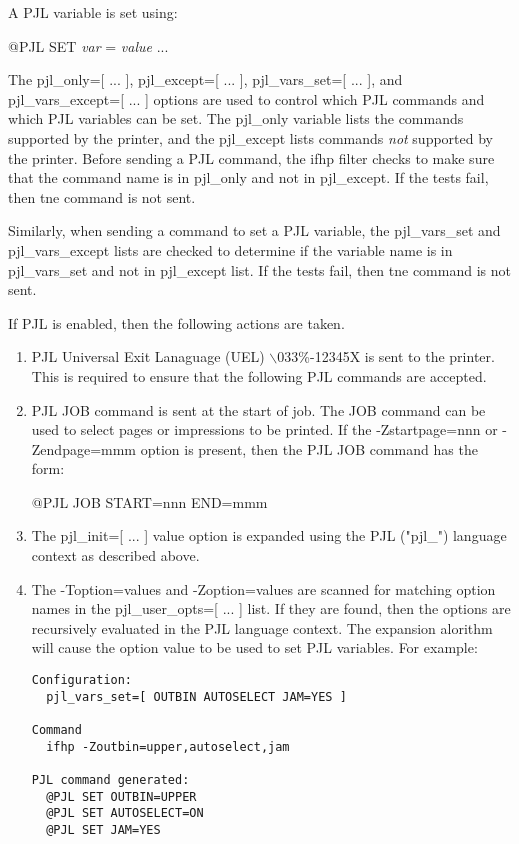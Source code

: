 \documentclass[a4paper]{article}
\begin{document}
A PJL variable is set using:
\begin{tscreen}
@PJL SET {\itshape var\/} = {\itshape value\/} ...
\end{tscreen}

The
{\ttfamily pjl\_only=[ ... ]},
{\ttfamily pjl\_except=[ ... ]},
{\ttfamily pjl\_vars\_set=[ ... ]},
and
{\ttfamily pjl\_vars\_except=[ ... ]}
options are used to control which PJL commands and which PJL variables
can be set.
The 
{\ttfamily pjl\_only}
variable lists the commands supported by the printer,
and the
{\ttfamily pjl\_except}
lists commands {\itshape not\/}
supported by the printer.
Before sending a PJL command,
the
{\ttfamily ifhp}
filter checks to make sure that the command name is in
{\ttfamily pjl\_only}
and not in
{\ttfamily pjl\_except}.
If the tests fail, then tne command is not sent.

Similarly,
when sending a command to set a PJL variable,
the
{\ttfamily pjl\_vars\_set}
and
{\ttfamily pjl\_vars\_except}
lists are checked to determine if the variable name is in
{\ttfamily pjl\_vars\_set}
and not in
{\ttfamily pjl\_except}
list.
If the tests fail, then tne command is not sent.

If PJL is enabled,
then the following actions are taken.
\begin{enumerate}
\item  PJL Universal Exit Lanaguage (UEL) {\ttfamily $\backslash$033\%-12345X} is sent to the printer.
This is required to ensure that the following PJL commands are
accepted.

\item  PJL JOB command is sent at the start of job.
The JOB command can be used to select pages or impressions to be printed.
If the
{\ttfamily -Zstartpage=nnn}
or
{\ttfamily -Zendpage=mmm}
option is present, then the PJL JOB command has the form:
\begin{tscreen}
@PJL JOB START=nnn END=mmm
\end{tscreen}
\item  The
{\ttfamily pjl\_init=[ ... ]}
value option is expanded using the PJL
({\ttfamily "pjl\_"}) language context as described above.
\item  The
{\ttfamily -Toption=value}s
and
{\ttfamily -Zoption=value}s
are scanned for matching option names in the 
{\ttfamily pjl\_user\_opts=[ ... ]} 
list.
If they are found,
then the options are recursively evaluated in the PJL language context.
The expansion alorithm will cause the option value to be used to set PJL
variables.
For example:
\begin{tscreen}
\begin{verbatim}
Configuration:
  pjl_vars_set=[ OUTBIN AUTOSELECT JAM=YES ]

Command
  ifhp -Zoutbin=upper,autoselect,jam

PJL command generated:
  @PJL SET OUTBIN=UPPER
  @PJL SET AUTOSELECT=ON
  @PJL SET JAM=YES
\end{verbatim}
\end{tscreen}
\end{enumerate}
\end{document}
